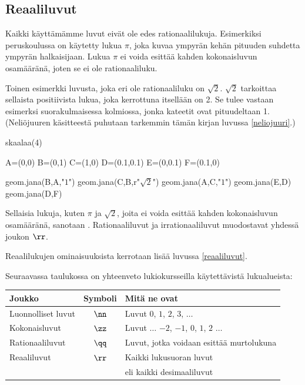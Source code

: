 \subsection*{Reaaliluvut}

Kaikki käyttämämme luvut eivät ole edes rationaalilukuja. Esimerkiksi peruskoulussa on käytetty
lukua $\pi$, joka kuvaa ympyrän kehän pituuden suhdetta ympyrän halkaisijaan. Lukua $\pi$ ei voida
esittää kahden kokonaisluvun osamääränä, joten se ei ole rationaaliluku.

Toinen esimerkki luvusta, joka eri ole rationaaliluku on $\sqrt{2}$. $\sqrt{2}$ tarkoittaa sellaista
positiivista lukua, joka kerrottuna itsellään on 2. Se tulee vastaan esimerksi suorakulmaisessa kolmiossa,
jonka kateetit ovat pituudeltaan 1. (Neliöjuuren käsitteestä puhutaan tarkemmin tämän kirjan luvussa \ref{neliojuuri}.)

\begin{kuva}
	skaalaa(4)

	A=(0,0)
	B=(0,1)
	C=(1,0)
	D=(0.1,0.1)
	E=(0,0.1)
	F=(0.1,0)

	geom.jana(B,A,"$1$")
	geom.jana(C,B,r"$\sqrt{2}$")
	geom.jana(A,C,"$1$")
	geom.jana(E,D)
	geom.jana(D,F)
\end{kuva}

Sellaisia lukuja, kuten $\pi$ ja $\sqrt{2}$, joita ei voida esittää kahden kokonaisluvun osamääränä,
sanotaan . Rationaaliluvut ja irrationaaliluvut muodostavat
yhdessä  joukon $\rr$.

Reaalilukujen ominaisuuksista kerrotaan lisää luvussa \ref{reaaliluvut}.

Seuraavassa taulukossa on yhteenveto lukiokursseilla käytettävistä lukualueista:
\begin{center}\begin{tabular}{l|c|l}
Joukko & Symboli & Mitä ne ovat\\
\hline
Luonnolliset luvut & $\nn$ &
Luvut $0$, $1$, $2$, $3$, $\ldots$ \\
Kokonaisluvut & $\zz$ & Luvut $\ldots$ $-2$, $-1$, $0$, $1$, $2$ $\ldots$ \\ 
Rationaaliluvut & $\qq$ & Luvut, jotka voidaan esittää
murtolukuna \\
Reaaliluvut & $\rr$ & Kaikki lukusuoran luvut \\
& & eli kaikki desimaaliluvut
\end{tabular} \end{center} 

